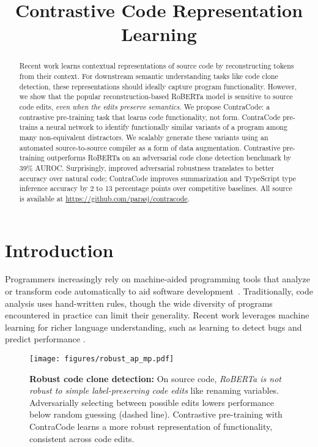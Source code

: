 \documentclass[11pt]{article}
\title{Contrastive Code Representation Learning}
\author{Paras Jain \and Ajay Jain \and Tianjun Zhang \and\\\textbf{Pieter Abbeel \and Joseph E. Gonzalez \and Ion Stoica} \\
	Department of EECS, UC Berkeley\\
  \texttt{\{parasj, ajayj, tianjunz,}\\\texttt{pabbeel, jegonzal, istoica\}@berkeley.edu}}
\newcommand{\ours}[0]{ContraCode}
\begin{document}
\maketitle
\begin{abstract}
Recent work learns contextual representations of source code by reconstructing tokens from their context. For downstream semantic understanding tasks like code clone detection, these representations should ideally capture program functionality. However, we show that the popular reconstruction-based RoBERTa model is sensitive to source code edits, \textit{even when the edits preserve semantics}. We propose ContraCode: a contrastive pre-training task that learns code functionality, not form. ContraCode pre-trains a neural network to identify functionally similar variants of a program among many non-equivalent distractors. We scalably generate these variants using an automated source-to-source compiler as a form of data augmentation. Contrastive pre-training outperforms RoBERTa on an adversarial code clone detection benchmark by 39\% AUROC. Surprisingly, improved adversarial robustness translates to better accuracy over natural code; ContraCode improves summarization and TypeScript type inference accuracy by 2 to 13 percentage points over competitive baselines. All source is available at \url{https://github.com/parasj/contracode}.
\end{abstract}

\section{Introduction}
Programmers increasingly rely on machine-aided programming tools that analyze or transform code automatically to aid software development~\citep{refactoring_kim2012field}. Traditionally, code analysis uses hand-written rules, though the wide diversity of programs encountered in practice can limit their generality. Recent work leverages machine learning for richer language understanding, such as learning to detect bugs \cite{pradel2018deepbugs} and predict performance \cite{mendis2019ithemal}.

\begin{figure}[t]
    \centering
    \texttt{[image: figures/robust\_ap\_mp.pdf]}
    \caption{\textbf{Robust code clone detection:} On source code, \emph{RoBERTa is not robust to simple label-preserving code edits} like renaming variables. Adversarially selecting between possible edits lowers performance below random guessing (dashed line). Contrastive pre-training with \ours{} learns a more robust representation of functionality, consistent across code edits.}
    \label{fig:bert_motivation_robust}
\end{figure}
\end{document}
